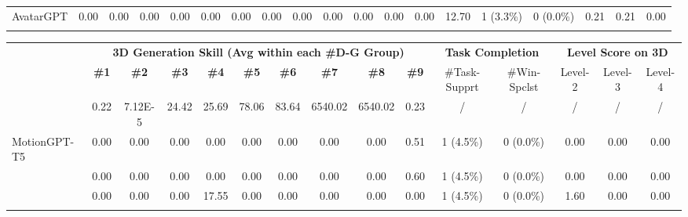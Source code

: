 \documentclass[letterpaper]{article} %
\begin{document}
{\begin{table*}[t!]
\begin{tabular}{p{2cm} ccccccccccccc cc ccc}
\multirow{1}{*}{AvatarGPT} & 0.00 &  0.00 & 0.00 & 0.00 & 0.00 & 0.00 & 0.00 & 0.00 & 0.00 & 0.00 & 0.00 & 0.00 & 12.70 & 1 (3.3\%) & 0 (0.0\%) & 0.21 & 0.21 & 0.00 \\
\addlinespace[2pt]

\Xhline{1.5pt}
\end{tabular}%
{
\fontsize{7.5}{8}\selectfont 
\setlength{\tabcolsep}{0.9mm}
\begin{tabular}{p{2.2cm} ccccccccc cc ccc}

\addlinespace[2pt]

 \rowcolor{bg-tb-heavey-3D} & \multicolumn{9}{c}{\bf \textcolor{blueGen}{3D Generation Skill (Avg within each \#D-G Group)}} & \multicolumn{2}{c}{\bf Task Completion} & \multicolumn{3}{c}{\bf Level Score on 3D} \\ 

\rowcolor{bg-tb-heavey-3D} \multicolumn{1}{c}{\multirow{-2}{*}{\bf  Model}}  & \bf\#1 & \bf\#2 & \bf\#3 & \bf\#4 & \bf\#5 & \bf\#6 & \bf\#7 & \bf\#8 & \bf\#9  & 
\multirow{1}{*}{\parbox{1.6cm}{\#Task-Supprt}} & \multirow{1}{*}{\parbox{1.6cm}{\#Win-Spclst}} & \multirow{1}{*}{Level-2}  & \multirow{1}{*}{Level-3}  & \multirow{1}{*}{Level-4}  \\
  \midrule

\rowcolor{bg-tb-light-3D} \multirow{1}{*}{\bf SoTA Specialist} & 0.22 & 7.12E-5 & 24.42 & 25.69 & 78.06 & 83.64 & 6540.02 & 6540.02 & 0.23 & \multirow{1}{*}{/} & \multirow{1}{*}{/} & \multirow{1}{*}{/} & \multirow{1}{*}{/} & \multirow{1}{*}{/} \\

\midrule\midrule


\multirow{1}{*}{MotionGPT-T5} & 0.00 & 0.00 & 0.00 & 0.00 & 0.00 & 0.00 & 0.00 & 0.00 & 0.51 & 1 (4.5\%) & 0 (0.0\%) & 0.00 & 0.00 & 0.00 \\
\addlinespace[2pt]

\rowcolor{bg-tb-light-3D} \multirow{1}{*}{MotionGPT-LLaMA} & 0.00 & 0.00 & 0.00 & 0.00 & 0.00 & 0.00 & 0.00 & 0.00 & 0.60 & 1 (4.5\%) & 0 (0.0\%) & 0.00 & 0.00 & 0.00 \\
\addlinespace[2pt]

\multirow{1}{*}{LLaMA-Mesh} & 0.00 & 0.00 & 0.00 & 17.55 & 0.00 & 0.00 & 0.00 & 0.00 & 0.00 & 1 (4.5\%) & 0 (0.0\%) & 1.60 & 0.00 & 0.00 \\
\addlinespace[2pt]


\bottomrule
\end{tabular}%
}
\vspace{-3mm}
\end{table*}
}
\end{document}
